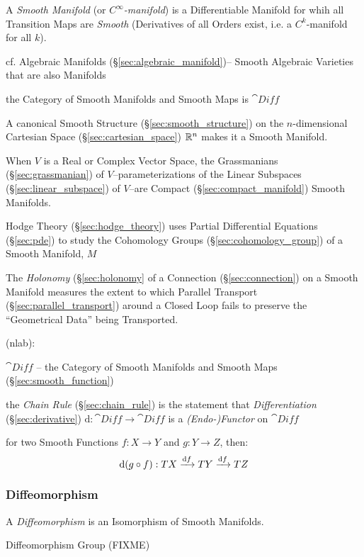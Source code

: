 A \emph{Smooth Manifold} (or \emph{$C^\infty$-manifold}) is a Differentiable
Manifold for whih all Transition Maps are \emph{Smooth} (Derivatives of
all Orders exist, i.e. a $C^k$-manifold for all $k$).

\fist cf. Algebraic Manifolds (\S\ref{sec:algebraic_manifold})-- Smooth
Algebraic Varieties that are also Manifolds

the Category of Smooth Manifolds and Smooth Maps is $\cat{Diff}$

A canonical Smooth Structure (\S\ref{sec:smooth_structure}) on the
$n$-dimensional Cartesian Space (\S\ref{sec:cartesian_space}) $\mathbb{R}^n$ makes
it a Smooth Manifold.

When $V$ is a Real or Complex Vector Space, the Grassmanians
(\S\ref{sec:grassmanian}) of $V$--parameterizations of the Linear Subspaces
(\S\ref{sec:linear_subspace}) of $V$--are Compact (\S\ref{sec:compact_manifold})
Smooth Manifolds.

\fist Hodge Theory (\S\ref{sec:hodge_theory}) uses Partial Differential
Equations (\S\ref{sec:pde}) to study the Cohomology Groups
(\S\ref{sec:cohomology_group}) of a Smooth Manifold, $M$

\fist The \emph{Holonomy} (\S\ref{sec:holonomy} of a Connection
(\S\ref{sec:connection}) on a Smooth Manifold measures the extent to which
Parallel Transport (\S\ref{sec:parallel_transport}) around a Closed Loop fails
to preserve the ``Geometrical Data'' being Transported.

(nlab):

$\cat{Diff}$ -- the Category of Smooth Manifolds and Smooth Maps
(\S\ref{sec:smooth_function})

the \emph{Chain Rule} (\S\ref{sec:chain_rule}) is the statement that
\emph{Differentiation} (\S\ref{sec:derivative}) $\mathrm{d} : \cat{Diff}
\rightarrow \cat{Diff}$ is a \emph{(Endo-)Functor} on $\cat{Diff}$

for two Smooth Functions $f : X \rightarrow Y$ and $g : Y \rightarrow Z$, then:
\[
  \mathrm{d}(g \circ f) : TX \xrightarrow{\mathrm{d}f} TY \xrightarrow{\mathrm{d}f} TZ
\]



\subsubsection{Diffeomorphism}\label{sec:diffeomorphism}

A \emph{Diffeomorphism} is an Isomorphism of Smooth Manifolds.

Diffeomorphism Group (FIXME)

